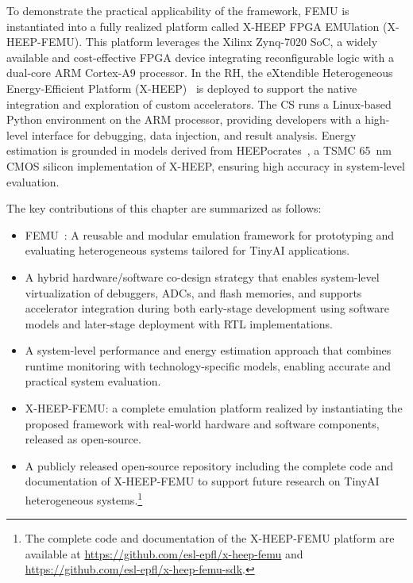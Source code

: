         To demonstrate the practical applicability of the framework, \mbox{FEMU} is instantiated into a fully realized platform called X-HEEP FPGA EMUlation (\mbox{X-HEEP-FEMU}). This platform leverages the Xilinx Zynq-7020 SoC, a widely available and cost-effective FPGA device integrating reconfigurable logic with a dual-core ARM Cortex-A9 processor. In the RH, the eXtendible Heterogeneous Energy-Efficient Platform (\mbox{X-HEEP})~\cite{x-heep} is deployed to support the native integration and exploration of custom accelerators. The CS runs a Linux-based Python environment on the ARM processor, providing developers with a high-level interface for debugging, data injection, and result analysis. Energy estimation is grounded in models derived from \mbox{HEEPocrates}~\cite{heepocrates}, a TSMC \SI{65}{\nano\meter} CMOS silicon implementation of \mbox{X-HEEP}, ensuring high accuracy in system-level evaluation.

        The key contributions of this chapter are summarized as follows:

        \vspace{-1em}
        \begin{itemize}
            \item \mbox{FEMU}~\cite{femu}: A reusable and modular emulation framework for prototyping and evaluating heterogeneous systems tailored for TinyAI applications.
    
            \item A hybrid hardware/software co-design strategy that enables system-level virtualization of debuggers, ADCs, and flash memories, and supports accelerator integration during both early-stage development using software models and later-stage deployment with RTL implementations.
    
            \item A system-level performance and energy estimation approach that combines runtime monitoring with technology-specific models, enabling accurate and practical system evaluation.
    
            \item \mbox{X-HEEP-FEMU}: a complete emulation platform realized by instantiating the proposed framework with real-world hardware and software components, released as open-source.

            \item A publicly released open-source repository including the complete code and documentation of \mbox{X-HEEP-FEMU} to support future research on TinyAI heterogeneous systems.\footnote{The complete code and documentation of the \mbox{X-HEEP-FEMU} platform are available at \url{https://github.com/esl-epfl/x-heep-femu} and \url{https://github.com/esl-epfl/x-heep-femu-sdk}.}
        \end{itemize}
        \vspace{-1em}
        
